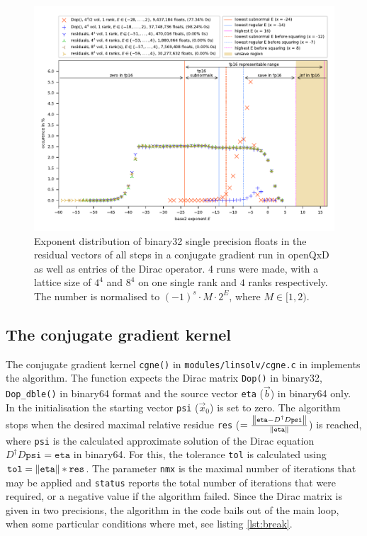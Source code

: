 \documentclass{article}
\theoremstyle{plain} %
\theoremstyle{remark} %
\def\code#1{\texttt{#1}}
\numberwithin{equation}{section}
\begin{document}
\begin{figure}
    \centering
    \includegraphics[width=1.0\textwidth]{plots/exponents_dirac}
    \caption{Exponent distribution of \gls{binary32} single precision floats in the residual vectors of all steps in a conjugate gradient run in openQxD as well as entries of the Dirac operator. 4 runs were made, with a lattice size of $4^4$ and $8^4$ on one single rank and $4$ ranks respectively. The number is normalised to $(-1)^s \cdot M \cdot 2^{E}$, where $M \in [1, 2)$.}
    \label{fig:exponents}
\end{figure}

\subsection{The conjugate gradient kernel}

The conjugate gradient kernel \code{cgne()} in \code{modules/linsolv/cgne.c} in \cite{openqxd} implements the algorithm. The function expects the Dirac matrix \code{Dop()} in \gls{binary32}, \code{Dop\_dble()} in \gls{binary64} format and the source vector \code{eta} ($\vec{b}$) in \gls{binary64} only. In the initialisation the starting vector \code{psi} ($\vec{x}_0$) is set to zero. The algorithm stops when the desired maximal relative residue \code{res} ($=\frac{\norm{\code{eta}-D^\dagger D \code{psi}}}{\norm{\code{eta}}}$) is reached, where \code{psi} is the calculated approximate solution of the Dirac equation $D^\dagger D \code{psi}=\code{eta}$ in \gls{binary64}. For this, the tolerance \code{tol} is calculated using $\code{tol} = \norm{\code{eta}} * \code{res}$. The parameter \code{nmx} is the maximal number of iterations that may be applied and \code{status} reports the total number of iterations that were required, or a negative value if the algorithm failed. Since the Dirac matrix is given in two precisions, the algorithm in the code bails out of the main loop, when some particular conditions where met, see listing \ref{lst:break}.
\end{document}
